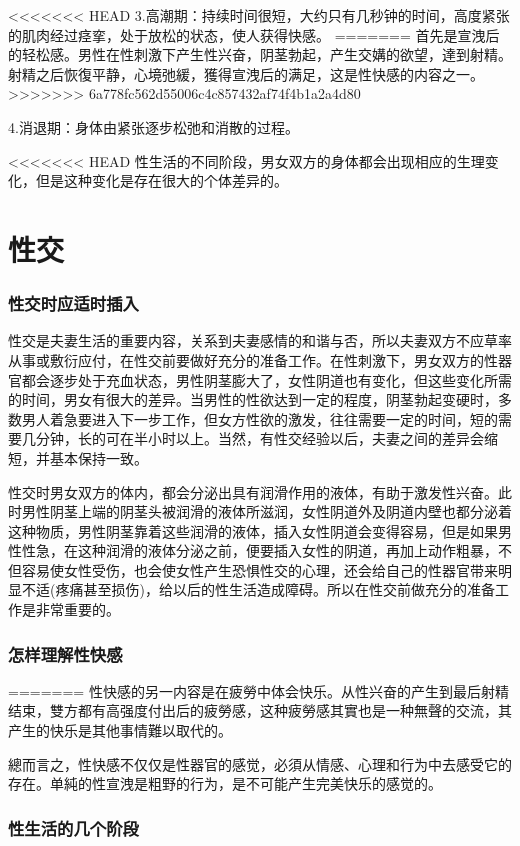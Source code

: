 \documentclass[12pt,UTF8]{ctexbook}
\begin{document}
<<<<<<< HEAD
3.高潮期：持续时间很短，大约只有几秒钟的时间，高度紧张的肌肉经过痉挛，处于放松的状态，使人获得快感。
=======
首先是宣洩后的轻松感。男性在性刺激下产生性兴奋，阴茎勃起，产生交媾的欲望，達到射精。射精之后恢復平静，心境弛緩，獲得宣洩后的满足，这是性快感的内容之一。
>>>>>>> 6a778fc562d55006c4c857432af74f4b1a2a4d80

4.消退期：身体由紧张逐步松弛和消散的过程。

<<<<<<< HEAD
性生活的不同阶段，男女双方的身体都会出现相应的生理变化，但是这种变化是存在很大的个体差异的。

\part{性交}

\section{性交时应适时插入}

性交是夫妻生活的重要内容，关系到夫妻感情的和谐与否，所以夫妻双方不应草率从事或敷衍应付，在性交前要做好充分的准备工作。在性刺激下，男女双方的性器官都会逐步处于充血状态，男性阴茎膨大了，女性阴道也有变化，但这些变化所需的时间，男女有很大的差异。当男性的性欲达到一定的程度，阴茎勃起变硬时，多数男人着急要进入下一步工作，但女方性欲的激发，往往需要一定的时间，短的需要几分钟，长的可在半小时以上。当然，有性交经验以后，夫妻之间的差异会缩短，并基本保持一致。

性交时男女双方的体内，都会分泌出具有润滑作用的液体，有助于激发性兴奋。此时男性阴茎上端的阴茎头被润滑的液体所滋润，女性阴道外及阴道内壁也都分泌着这种物质，男性阴茎靠着这些润滑的液体，插入女性阴道会变得容易，但是如果男性性急，在这种润滑的液体分泌之前，便要插入女性的阴道，再加上动作粗暴，不但容易使女性受伤，也会使女性产生恐惧性交的心理，还会给自己的性器官带来明显不适(疼痛甚至损伤)，给以后的性生活造成障碍。所以在性交前做充分的准备工作是非常重要的。

\section{怎样理解性快感}
=======
性快感的另一内容是在疲勞中体会快乐。从性兴奋的产生到最后射精结束，雙方都有高强度付出后的疲勞感，这种疲勞感其實也是一种無聲的交流，其产生的快乐是其他事情難以取代的。

總而言之，性快感不仅仅是性器官的感觉，必須从情感、心理和行为中去感受它的存在。单純的性宣洩是粗野的行为，是不可能产生完美快乐的感觉的。

\section{性生活的几个阶段}
\end{document}
